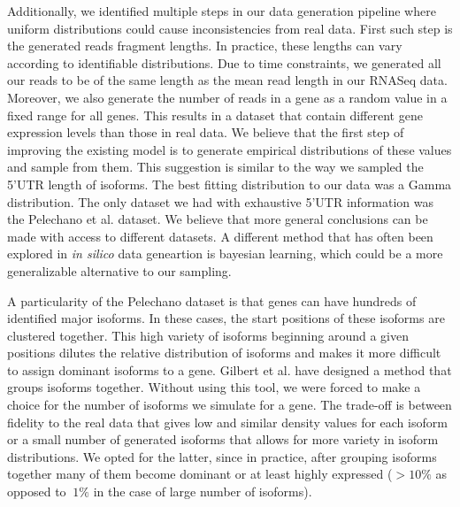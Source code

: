 \documentclass[12pt]{article}
\begin{document}
Additionally, we identified multiple steps in our data generation pipeline where uniform distributions could cause inconsistencies from real data. First such step is the generated reads fragment lengths. In practice, these lengths can vary according to identifiable distributions. Due to time constraints, we generated all our reads to be of the same length as the mean read length in our RNASeq data. Moreover, we also generate the number of reads in a gene as a random value in a fixed range for all genes. This results in a dataset that contain different gene expression levels than those in real data. We believe that the first step of improving the existing model is to generate empirical distributions of these values and sample from them. This suggestion is similar to the way we sampled the 5'UTR length of isoforms. The best fitting distribution to our data was a Gamma distribution. The only dataset we had with exhaustive 5'UTR information was the Pelechano et al. \cite{Pelechano2013} dataset. We believe that more general conclusions can be made with access to different datasets. A different method that has often been explored \cite{Lopez2018} in \textit{in silico} data geneartion is bayesian learning, which could be a more generalizable alternative to our sampling. 

A particularity of the Pelechano \cite{Pelechano2013} dataset is that genes can have hundreds of identified major isoforms. In these cases, the start positions of these isoforms are clustered together. This high variety of isoforms beginning around a given positions dilutes the relative distribution of isoforms and makes it more difficult to assign dominant isoforms to a gene. Gilbert et al. have designed a method that groups isoforms together. Without using this tool, we were forced to make a choice for the number of isoforms we  simulate for a gene. The trade-off is between fidelity to the real data that gives low and similar density values for each isoform or a small number of generated isoforms that allows for more variety in isoform distributions. We opted for the latter, since in practice, after grouping isoforms together many of them become dominant or at least highly expressed ($>10\%$ as opposed to $~1\%$ in the case of large number of isoforms). 
\end{document}

